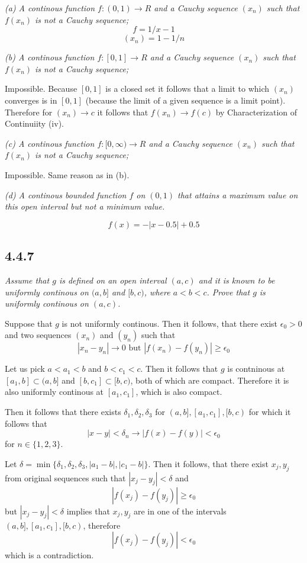 \documentclass[11pt,oneside,titlepage]{book}
\begin{document}
\textit{(a) A continous function $f: (0, 1) \to R$ and a Cauchy sequence
  $(x_n)$ such that $f(x_n)$ is not a Cauchy sequence;}
$$f = 1 / x - 1$$
$$(x_n) = 1 - 1/n$$

\textit{(b) A continous function $f: [0, 1] \to R$ and a Cauchy sequence
  $(x_n)$ such that $f(x_n)$ is not a Cauchy sequence;}

Impossible. Because $[0, 1]$ is a closed set it follows that a limit
to which $(x_n)$ converges  is in $[0, 1]$ (because the limit of a given
sequence is a limit point). Therefore for 
$(x_n) \to c$ it follows that $f(x_n) \to f(c)$ by Characterization of
Continuiity (iv).

\textit{(c) A continous function $f: [0, \infty) \to R$ and a Cauchy sequence
  $(x_n)$ such that $f(x_n)$ is not a Cauchy sequence;}

Impossible. Same reason as in (b).

\textit{(d) A continous bounded function $f$ on $(0, 1)$ that attains a
  maximum value on this open interval but not a minimum value.}

$$f(x) = -|x - 0.5| + 0.5$$

\subsection*{4.4.7}
\textit{Assume that $g$ is defined on an open interval $(a, c)$ and it is
  known to be uniformly continous on $(a, b]$ and $[b, c)$, where
  $a < b < c$. Prove that $g$ is uniformly continous on $(a, c)$.}

Suppose that $g$ is not uniformly continous. Then it follows, that
there exist $\epsilon_0 > 0$ and
two sequences $(x_n)$ and $(y_n)$ such that
$$|x_n - y_n| \to 0 \text{ but } |f(x_n) - f(y_n)| \geq \epsilon_0$$

Let us pick $a < a_1 < b$ and $b < c_1 < c$. Then it follows that
$g$ is contninous at $[a_1, b] \subset (a, b] $ and $[b, c_1] \subset [b, c)$,
both of which are compact. Therefore it is also uniformly continous at
$[a_1, c_1]$, which is also compact.

Then it follows that there exists $\delta_1, \delta_2, \delta_3$ for
$(a, b], [a_1, c_1], [b, c)$ for which it follows that
$$|x - y| < \delta_n \to |f(x) - f(y)| < \epsilon_0$$
for $n \in \{1, 2, 3\}$.

Let $\delta = \min\{\delta_1, \delta_2, \delta_3, |a_1 - b|, |c_1 - b|\}$.
Then it follows, that there exist $x_j, y_j$ from original sequences
such that $|x_j - y_j| < \delta$ and 
$$|f(x_j) - f(y_j)| \geq \epsilon_0$$
but $|x_j - y_j| < \delta$ implies that $x_j, y_j$ are in one of the
intervals $(a, b], [a_1, c_1], [b, c)$, therefore 
$$|f(x_j) - f(y_j)| < \epsilon_0$$
which is a contradiction.
\end{document}
